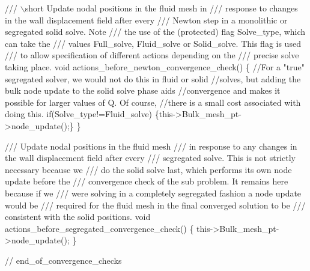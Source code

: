  
\begin{DoxyCodeInclude}
 \textcolor{comment}{/// \(\backslash\)short Update nodal positions in the fluid mesh in}
\textcolor{comment}{ /// response to changes in the wall displacement field after every}
\textcolor{comment}{}\textcolor{comment}{ /// Newton step in a monolithic or segregated solid solve. Note}
\textcolor{comment}{}\textcolor{comment}{ /// the use of the (protected) flag Solve\_type, which can take the}
\textcolor{comment}{}\textcolor{comment}{ /// values Full\_solve, Fluid\_solve or Solid\_solve. This flag is used}
\textcolor{comment}{}\textcolor{comment}{ /// to allow specification of different actions depending on the}
\textcolor{comment}{}\textcolor{comment}{ /// precise solve taking place.}
\textcolor{comment}{} \textcolor{keywordtype}{void} actions\_before\_newton\_convergence\_check()
  \{
   \textcolor{comment}{//For a "true" segregated solver, we would not do this in fluid or solid}
   \textcolor{comment}{//solves, but adding the bulk node update to the solid solve phase aids}
   \textcolor{comment}{//convergence and makes it possible for larger values of Q. Of course,}
   \textcolor{comment}{//there is a small cost associated with doing this.}
   \textcolor{keywordflow}{if}(Solve\_type!=Fluid\_solve) \{this->Bulk\_mesh\_pt->node\_update();\}
  \}

\textcolor{comment}{}
\textcolor{comment}{ /// Update nodal positions in the fluid mesh}
\textcolor{comment}{ /// in response to any changes in the wall displacement field after every }
\textcolor{comment}{ /// segregated solve. This is not strictly necessary because we}
\textcolor{comment}{ /// do the solid solve last, which performs its own node update before the }
\textcolor{comment}{ /// convergence check of the sub problem. It remains here because if we}
\textcolor{comment}{ /// were solving in a completely segregated fashion a node update would be }
\textcolor{comment}{ /// required for the fluid mesh in the final converged solution to be}
\textcolor{comment}{ /// consistent with the solid positions.}
\textcolor{comment}{} \textcolor{keywordtype}{void} actions\_before\_segregated\_convergence\_check()
  \{ 
   this->Bulk\_mesh\_pt->node\_update();
  \} 

 \textcolor{comment}{// end\_of\_convergence\_checks}

\end{DoxyCodeInclude}




